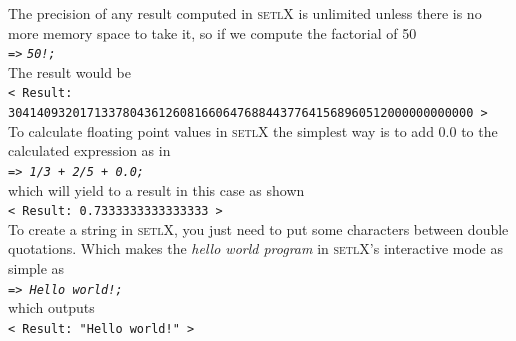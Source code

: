 \documentclass[11pt]{article}
\begin{document}
The precision of any result computed in \textsc{setlX} is unlimited unless there is no more memory space to take it, so if we compute the factorial of 50
\\[0.2cm]
\hspace*{1.3cm}
\texttt{=>} \texttt{\textsl{50!;}}
\\[0.2cm]
The result would be
\\[0.2cm]
\hspace*{0.6cm}
\texttt{< Result: 30414093201713378043612608166064768844377641568960512000000000000 >}
\\[0.2cm]
To calculate floating point values in \textsc{setlX} the simplest way is to add 0.0 to the calculated expression as in
\\[0.2cm]
\hspace*{1.3cm}
\texttt{=> \textsl{1/3 + 2/5 + 0.0;}}
\\[0.2cm]
which will yield to a result in this case as shown
\\[0.2cm]
\hspace*{1.3cm}
\texttt{< Result: 0.7333333333333333 >}
\\[0.2cm] 

To create a string in \textsc{setlX}, you just need to put some characters between double quotations. Which makes the \textsl{hello world program} in \textsc{setlX}'s interactive mode as simple as
\\[0.2cm]
\hspace*{1.3cm}
\texttt{=> \textsl{Hello world!;}}
\\[0.2cm]
which outputs 
\\[0.2cm]
\hspace*{1.3cm}
\texttt{< Result: "Hello world!" >}
\texttt{}
\\[0.2cm]
\end{document}
